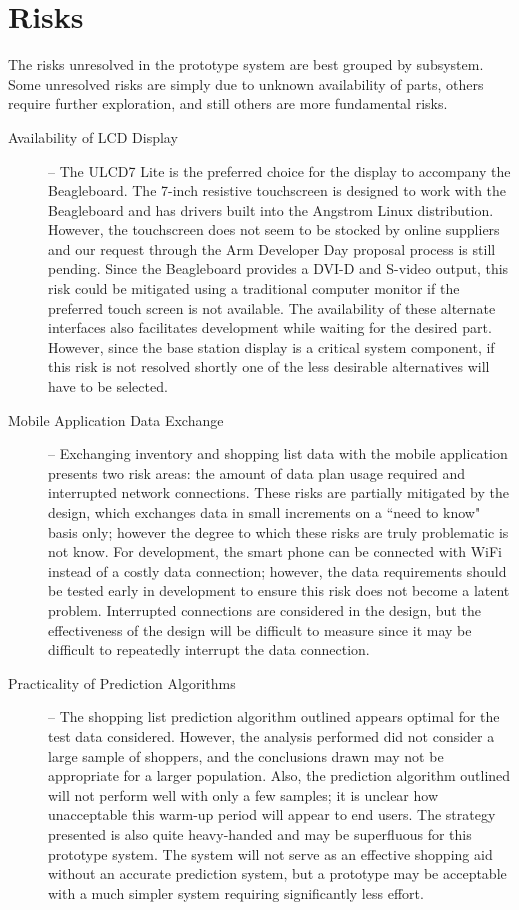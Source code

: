 \documentclass[11pt]{article} %
\begin{document}
\section{Risks}
The risks unresolved in the prototype system are best grouped by subsystem. Some unresolved risks are simply due to unknown availability of parts, others require further exploration, and still others are more fundamental risks.
\begin{description}
\item[Availability of LCD Display] -- The ULCD7 Lite is the preferred choice for the display to accompany the Beagleboard. The 7-inch resistive touchscreen is designed to work with the Beagleboard and has drivers built into the Angstrom Linux distribution. However, the touchscreen does not seem to be stocked by online suppliers and our request through the Arm Developer Day proposal process is still pending. Since the Beagleboard provides a DVI-D and S-video output, this risk could be mitigated using a traditional computer monitor if the preferred touch screen is not available. The availability of these alternate interfaces also facilitates development while waiting for the desired part. However, since the base station display is a critical system component, if this risk is not resolved shortly one of the less desirable alternatives will have to be selected.
\item[Mobile Application Data Exchange] -- Exchanging inventory and shopping list data with the mobile application presents two risk areas: the amount of data plan usage required and interrupted network connections. These risks are partially mitigated by the design, which exchanges data in small increments on a ``need to know" basis only; however the degree to which these risks are truly problematic is not know. For development, the smart phone can be connected with WiFi instead of a costly data connection; however, the data requirements should be tested early in development to ensure this risk does not become a latent problem. Interrupted connections are considered in the design, but the effectiveness of the design will be difficult to measure since it may be difficult to repeatedly interrupt the data connection.
\item[Practicality of Prediction Algorithms] -- The shopping list prediction algorithm outlined appears optimal for the test data considered. However, the analysis performed did not consider a large sample of shoppers, and the conclusions drawn may not be appropriate for a larger population. Also, the prediction algorithm outlined will not perform well with only a few samples; it is unclear how unacceptable this warm-up period will appear to end users. The strategy presented is also quite heavy-handed and may be superfluous for this prototype system. The system will not serve as an effective shopping aid without an accurate prediction system, but a prototype may be acceptable with a much simpler system requiring significantly less effort.

\end{description}
\end{document}
